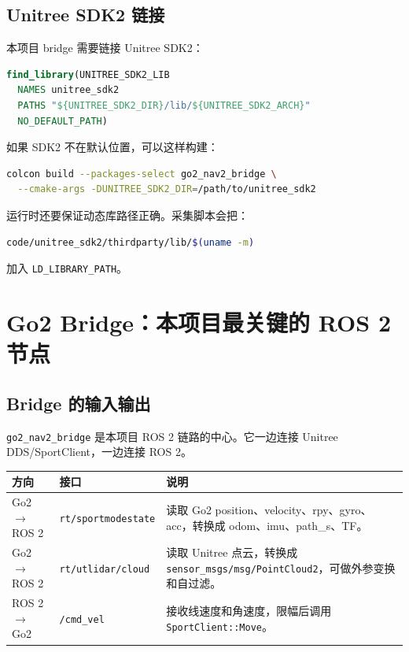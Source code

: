 \documentclass[UTF8,11pt,a4paper,openany]{ctexrep}
\newcommand{\code}[1]{\nolinkurl{#1}}
\newcommand{\topic}[1]{\nolinkurl{#1}}
\newcommand{\rosnode}[1]{\nolinkurl{#1}}
\newcommand{\msg}[1]{\nolinkurl{#1}}
\begin{document}
\section{Unitree SDK2 链接}

本项目 bridge 需要链接 Unitree SDK2：

\begin{lstlisting}[language=cmake]
find_library(UNITREE_SDK2_LIB
  NAMES unitree_sdk2
  PATHS "${UNITREE_SDK2_DIR}/lib/${UNITREE_SDK2_ARCH}"
  NO_DEFAULT_PATH)
\end{lstlisting}

如果 SDK2 不在默认位置，可以这样构建：

\begin{lstlisting}[language=bash]
colcon build --packages-select go2_nav2_bridge \
  --cmake-args -DUNITREE_SDK2_DIR=/path/to/unitree_sdk2
\end{lstlisting}

运行时还要保证动态库路径正确。采集脚本会把：

\begin{lstlisting}[language=bash]
code/unitree_sdk2/thirdparty/lib/$(uname -m)
\end{lstlisting}

加入 \code{LD_LIBRARY_PATH}。

\chapter{Go2 Bridge：本项目最关键的 ROS 2 节点}
\label{chap:bridge}

\section{Bridge 的输入输出}

\rosnode{go2_nav2_bridge} 是本项目 ROS 2 链路的中心。它一边连接 Unitree DDS/SportClient，一边连接 ROS 2。

\begin{longtable}{L{0.23\textwidth} L{0.18\textwidth} L{0.48\textwidth}}
\toprule
\textbf{方向} & \textbf{接口} & \textbf{说明} \\
\midrule
\endhead
Go2 \(\rightarrow\) ROS 2 & \code{rt/sportmodestate} & 读取 Go2 position、velocity、rpy、gyro、acc，转换成 odom、imu、path\_s、TF。\\
Go2 \(\rightarrow\) ROS 2 & \code{rt/utlidar/cloud} & 读取 Unitree 点云，转换成 \msg{sensor_msgs/msg/PointCloud2}，可做外参变换和自过滤。\\
ROS 2 \(\rightarrow\) Go2 & \topic{/cmd_vel} & 接收线速度和角速度，限幅后调用 \code{SportClient::Move}。\\
\bottomrule
\end{longtable}
\end{document}
